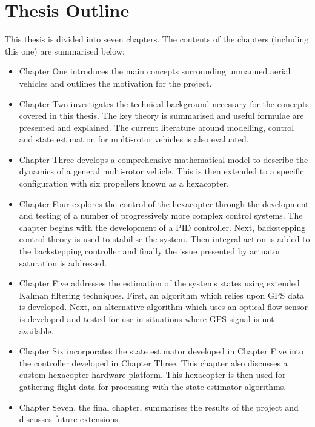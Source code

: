 \section{Thesis Outline}
This thesis is divided into seven chapters. The contents of the chapters (including this one) are summarised below:
\begin{itemize}
\item Chapter One introduces the main concepts surrounding unmanned aerial vehicles and outlines the motivation for the project.
\item Chapter Two investigates the technical background necessary for the concepts covered in this thesis. The key theory is summarised and useful formulae are presented and explained. The current literature around modelling, control and state estimation for multi-rotor vehicles is also evaluated.
\item Chapter Three develops a comprehensive mathematical model to describe the dynamics of a general multi-rotor vehicle. This is then extended to a specific configuration  with six propellers known as a hexacopter.
\item Chapter Four explores the control of the hexacopter through the development and testing of a number of progressively more complex control systems. The chapter begins with the development of a PID controller. Next, backstepping control theory is used to stabilise the system. Then integral action is added to the backstepping controller and finally the issue presented by actuator saturation is addressed.
\item Chapter Five addresses the estimation of the systems states using extended Kalman filtering techniques. First, an algorithm which relies upon GPS data is developed. Next, an alternative algorithm which uses an optical flow sensor is developed and tested for use in situations where GPS signal is not available.
\item Chapter Six incorporates the state estimator developed in Chapter Five into the controller developed in Chapter Three. This chapter also discusses a custom hexacopter hardware platform. This hexacopter is then used for gathering flight data for processing with the state estimator algorithms.
\item Chapter Seven, the final chapter, summarises the results of the project and discusses future extensions.
\end{itemize}

\clearpage


